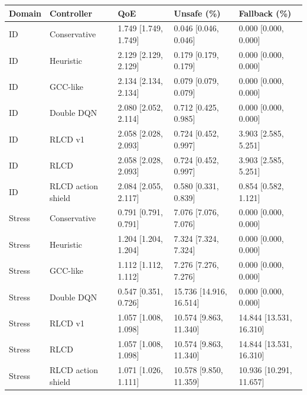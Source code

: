 \begin{tabular}{lllll}
\toprule
Domain & Controller & QoE & Unsafe (\%) & Fallback (\%) \\
\midrule
ID & Conservative & 1.749 [1.749, 1.749] & 0.046 [0.046, 0.046] & 0.000 [0.000, 0.000] \\
ID & Heuristic & 2.129 [2.129, 2.129] & 0.179 [0.179, 0.179] & 0.000 [0.000, 0.000] \\
ID & GCC-like & 2.134 [2.134, 2.134] & 0.079 [0.079, 0.079] & 0.000 [0.000, 0.000] \\
ID & Double DQN & 2.080 [2.052, 2.114] & 0.712 [0.425, 0.985] & 0.000 [0.000, 0.000] \\
ID & RLCD v1 & 2.058 [2.028, 2.093] & 0.724 [0.452, 0.997] & 3.903 [2.585, 5.251] \\
ID & RLCD & 2.058 [2.028, 2.093] & 0.724 [0.452, 0.997] & 3.903 [2.585, 5.251] \\
ID & RLCD action shield & 2.084 [2.055, 2.117] & 0.580 [0.331, 0.839] & 0.854 [0.582, 1.121] \\
Stress & Conservative & 0.791 [0.791, 0.791] & 7.076 [7.076, 7.076] & 0.000 [0.000, 0.000] \\
Stress & Heuristic & 1.204 [1.204, 1.204] & 7.324 [7.324, 7.324] & 0.000 [0.000, 0.000] \\
Stress & GCC-like & 1.112 [1.112, 1.112] & 7.276 [7.276, 7.276] & 0.000 [0.000, 0.000] \\
Stress & Double DQN & 0.547 [0.351, 0.726] & 15.736 [14.916, 16.514] & 0.000 [0.000, 0.000] \\
Stress & RLCD v1 & 1.057 [1.008, 1.098] & 10.574 [9.863, 11.340] & 14.844 [13.531, 16.310] \\
Stress & RLCD & 1.057 [1.008, 1.098] & 10.574 [9.863, 11.340] & 14.844 [13.531, 16.310] \\
Stress & RLCD action shield & 1.071 [1.026, 1.111] & 10.578 [9.850, 11.359] & 10.936 [10.291, 11.657] \\
\bottomrule
\end{tabular}
